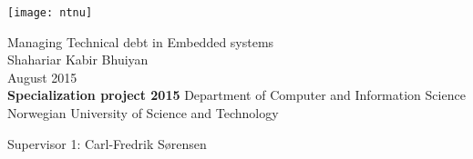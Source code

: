 
\thispagestyle{empty}
\texttt{[image: ntnu]}
\mbox{}\\[6pc]
\begin{center}
\Huge{Managing Technical debt in Embedded systems}\\[2pc]

\Large{Shahariar Kabir Bhuiyan}\\[1pc]
\large{August 2015}\\[2pc]

\textbf{Specialization project 2015}
\linebreak
Department of Computer and Information Science\\
Norwegian University of Science and Technology
\end{center}
\vfill

\noindent Supervisor 1: Carl-Fredrik Sørensen

